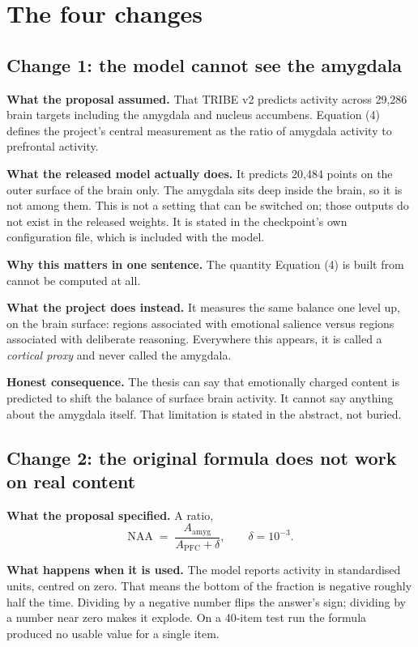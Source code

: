 \documentclass[11pt,a4paper]{article}
\newcommand{\naa}{\mathrm{NAA}}
\begin{document}
\section{The four changes}

\subsection{Change 1: the model cannot see the amygdala}

\textbf{What the proposal assumed.} That TRIBE v2 predicts activity across 29{,}286
brain targets including the amygdala and nucleus accumbens. Equation (4) defines the
project's central measurement as the ratio of amygdala activity to prefrontal activity.

\textbf{What the released model actually does.} It predicts 20{,}484 points on the
outer surface of the brain only. The amygdala sits deep inside the brain, so it is
not among them. This is not a setting that can be switched on; those outputs do not
exist in the released weights. It is stated in the checkpoint's own configuration
file, which is included with the model.

\textbf{Why this matters in one sentence.} The quantity Equation (4) is built from
cannot be computed at all.

\textbf{What the project does instead.} It measures the same balance one level up,
on the brain surface: regions associated with emotional salience versus regions
associated with deliberate reasoning. Everywhere this appears, it is called a
\emph{cortical proxy} and never called the amygdala.

\textbf{Honest consequence.} The thesis can say that emotionally charged content is
predicted to shift the balance of surface brain activity. It cannot say anything
about the amygdala itself. That limitation is stated in the abstract, not buried.

\subsection{Change 2: the original formula does not work on real content}

\textbf{What the proposal specified.} A ratio,
\[
\naa \;=\; \frac{A_{\text{amyg}}}{A_{\text{PFC}} + \delta},
\qquad \delta = 10^{-3}.
\]

\textbf{What happens when it is used.} The model reports activity in standardised
units, centred on zero. That means the bottom of the fraction is negative roughly
half the time. Dividing by a negative number flips the answer's sign; dividing by
a number near zero makes it explode. On a 40-item test run the formula produced no
usable value for a single item.
\end{document}
